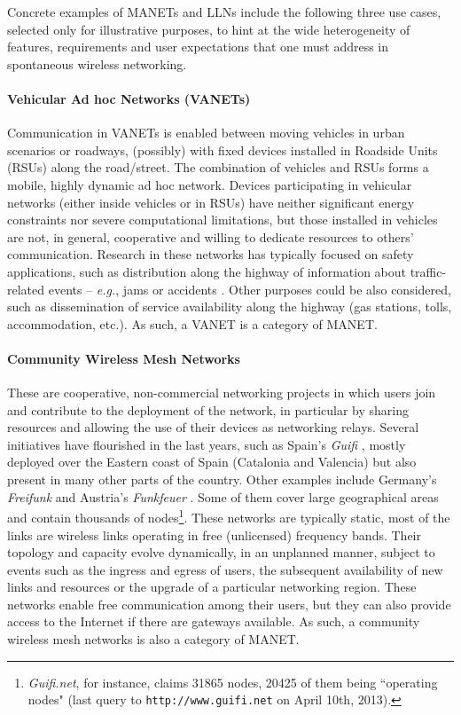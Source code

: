 Concrete examples of MANETs and LLNs include the following three use cases, selected only for illustrative purposes, to hint at the wide heterogeneity of features, requirements and user expectations that one must address in spontaneous wireless networking.

\paragraph{Vehicular Ad hoc Networks (VANETs)} Communication in VANETs is enabled between moving vehicles in urban scenarios or roadways, (possibly) with fixed devices installed in Roadside Units (RSUs) along the road/street. The combination of vehicles and RSUs forms a mobile, highly dynamic ad hoc network. Devices participating in vehicular networks (either inside vehicles or in RSUs) have neither significant energy constraints nor severe computational limitations, but those installed in vehicles are not, in general, cooperative and willing to dedicate resources to others' communication. Research in these networks has typically focused on safety applications, such as distribution along the highway of information about traffic-related events -- \emph{e.g.}, jams or accidents \cite{bc_vanet}. Other purposes could be also considered, such as dissemination of service availability along the highway (gas stations, tolls, accommodation, etc.). As such, a VANET is a category of MANET.

\paragraph{Community Wireless Mesh Networks} These are cooperative, non-commercial networking projects in which users join and contribute to the deployment of the network, in particular by sharing resources and allowing the use of their devices as networking relays. Several initiatives have flourished in the last years, such as Spain's {\em Guifi} \cite{GUIFI}, mostly deployed over the Eastern coast of Spain (Catalonia and Valencia) but also present in many other parts of the country. Other examples include Germany's {\em Freifunk} \cite{FREIFUNK} and Austria's {\em Funkfeuer} \cite{FUNKFEUER}. Some of them cover large geographical areas and contain thousands of nodes\footnote{{\em Guifi.net}, for instance, claims 31865 nodes, 20425 of them being ``operating nodes" (last query to {\tt http://www.guifi.net} on April 10th, 2013).}. These networks are typically static, most of the links are wireless links operating in free (unlicensed) frequency bands. Their topology and capacity evolve dynamically, in an unplanned manner, subject to events such as the ingress and egress of users, the subsequent availability of new links and resources or the upgrade of a particular networking region. These networks enable free communication among their users, but they can also provide access to the Internet if there are gateways available. As such, a community wireless mesh networks is also a category of MANET.

